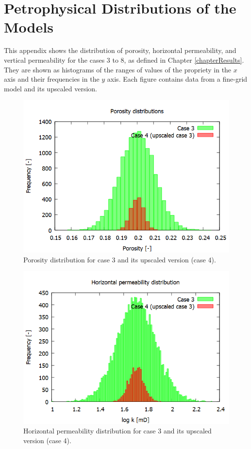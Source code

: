 \chapter{Petrophysical Distributions of the Models}
\label{appendix-models-descriptions}

This appendix shows the distribution of porosity, horizontal permeability, and vertical permeability for the cases 3 to 8, as defined in Chapter \ref{chapterResults}. They are shown as histograms of the ranges of values of the propriety in the $x$ axis and their frequencies in the $y$ axis. Each figure contains data from a fine-grid model and its upscaled version.
\begin{figure}[H]
	\centering
	\includegraphics[width=0.82\linewidth]{Images/37}
	\caption{Porosity distribution for case 3 and its upscaled version (case 4).}
	\label{fig:37}
\end{figure}
\begin{figure}[H]
	\centering
	\includegraphics[width=0.82\linewidth]{Images/38}
	\caption{Horizontal permeability distribution for case 3 and its upscaled version (case 4).}
	\label{fig:38}
\end{figure}
